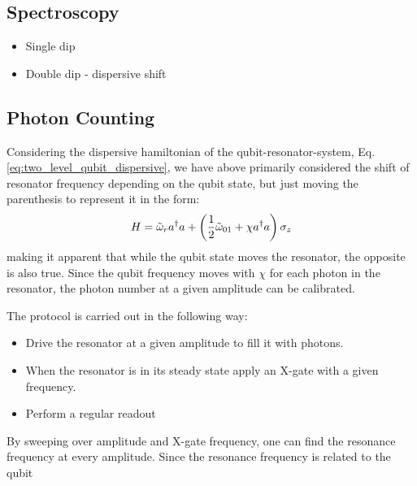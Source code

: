 \subsection{Spectroscopy}
\begin{itemize}
    \item Single dip
    \item Double dip - dispersive shift
\end{itemize}

\subsection{Photon Counting}
Considering the dispersive hamiltonian of the qubit-resonator-system, Eq. \ref{eq:two_level_qubit_dispersive}, we have above primarily considered the shift of resonator frequency depending on the qubit state, but just moving the parenthesis to represent it in the form:
\begin{equation}
    H = \Tilde{\omega}_r a^\dagger a  + \left(\frac12 \Tilde{\omega}_{01} + \chi a^\dagger a\right)  \sigma_z
\end{equation}
making it apparent that while the qubit state moves the resonator, the opposite is also true. Since the qubit frequency moves with $\chi$ for each photon in the resonator, the photon number at a given amplitude can be calibrated.  

The protocol is carried out in the following way:
\begin{itemize}
    \item Drive the resonator at a given amplitude to fill it with photons.
    \item When the resonator is in its steady state apply an X-gate with a given frequency.
    \item Perform a regular readout
\end{itemize}
By sweeping over amplitude and X-gate frequency, one can find the resonance frequency at every amplitude. Since the resonance frequency is related to the qubit \\

